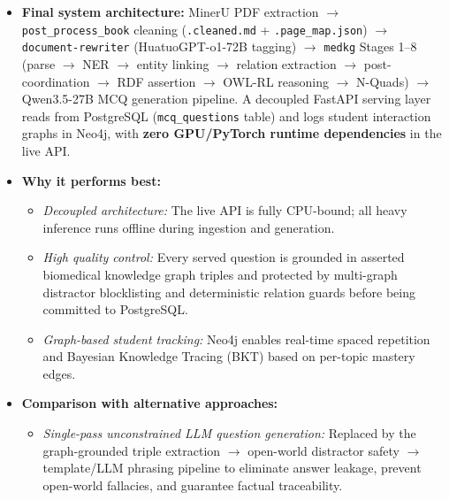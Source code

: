 \begin{itemize}
    \item \textbf{Final system architecture:}
          MinerU PDF extraction $\rightarrow$ \texttt{post\_process\_book} cleaning
          (\texttt{.cleaned.md} + \texttt{.page\_map.json}) $\rightarrow$
          \texttt{document-rewriter} (HuatuoGPT-o1-72B tagging) $\rightarrow$
          \texttt{medkg} Stages 1--8 (parse $\rightarrow$ NER $\rightarrow$ entity linking
          $\rightarrow$ relation extraction $\rightarrow$ post-coordination $\rightarrow$
          RDF assertion $\rightarrow$ OWL-RL reasoning $\rightarrow$ N-Quads) $\rightarrow$
          Qwen3.5-27B MCQ generation pipeline. A decoupled FastAPI serving layer reads
          from PostgreSQL (\texttt{mcq\_questions} table) and logs student interaction graphs
          in Neo4j, with \textbf{zero GPU/PyTorch runtime dependencies} in the live API.

    \item \textbf{Why it performs best:}
    \begin{itemize}
        \item \textit{Decoupled architecture:} The live API is fully CPU-bound; all heavy
              inference runs offline during ingestion and generation.
        \item \textit{High quality control:} Every served question is grounded in asserted
              biomedical knowledge graph triples and protected by multi-graph distractor
              blocklisting and deterministic relation guards before being committed to PostgreSQL.
        \item \textit{Graph-based student tracking:} Neo4j enables real-time spaced repetition
              and Bayesian Knowledge Tracing (BKT) based on per-topic mastery edges.
    \end{itemize}

    \item \textbf{Comparison with alternative approaches:}
    \begin{itemize}
        \item \textit{Single-pass unconstrained LLM question generation:} Replaced by the graph-grounded
              triple extraction $\rightarrow$ open-world distractor safety $\rightarrow$ template/LLM phrasing pipeline
              to eliminate answer leakage, prevent open-world fallacies, and guarantee factual traceability.
    \end{itemize}


\end{itemize}
